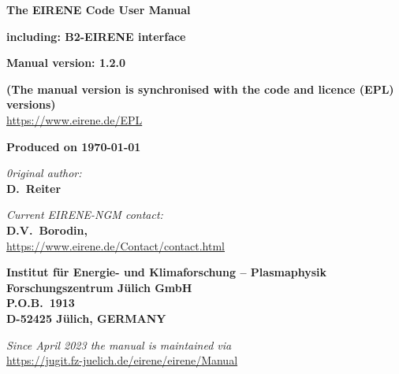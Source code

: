 \documentclass[%
  12pt,
  DIV=13,
  abstract=true,
  chapterprefix=true,
  numbers=noendperiod,
  toc=bib
]{scrreprt}
\begin{document}
  \begin{titlepage}

    \vspace*{4cm}

    \begin{center}
      {\Huge \textbf{The EIRENE Code User Manual}}

      \vspace{1cm}

      {\Large \textbf{including: B2-EIRENE interface }}
      \vspace{2cm}

      {\Large \textbf{Manual version:  1.2.0\\ }}

      {\textbf{(The manual version is synchronised with the code and licence (EPL) versions)\\}}
      \url{https://www.eirene.de/EPL}

      \vspace{0.75em}

      {\textbf{Produced on \today\\}}
    \end{center}

      \vspace{4cm}

      {\Large \textit{0riginal author:}\\
              \textbf{D.~Reiter}}

           \vspace{0.75em}

      {\Large \textit{Current EIRENE-NGM contact:}\\
              \textbf{D.V.~Borodin,}} \\
                      \url{https://www.eirene.de/Contact/contact.html}

           \vspace{0.75em}

       {\Large  \textbf{Institut f\"ur Energie- und Klimaforschung -- Plasmaphysik\\
                        Forschungszentrum J\"ulich GmbH\\
                        P.O.B.\ 1913\\
                        D-52425 J\"ulich, GERMANY}}

              \vspace{1.5em}

       {\Large    \textit{Since April 2023 the manual is maintained via}}\\
              \url{https://jugit.fz-juelich.de/eirene/eirene/Manual}


\end{titlepage}
\end{document}
